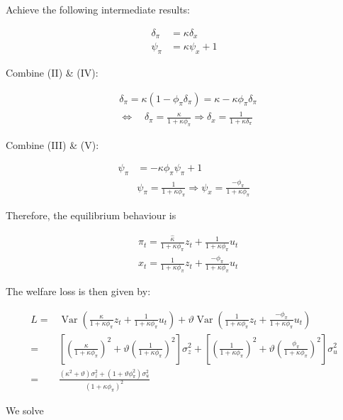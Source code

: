 {\begin{enumerate}[label=(\alph*)]
{Achieve the following intermediate results:

\begin{align*}
    \delta_{\pi} &= \kappa \delta_{x} \tag{IV}\\
    \psi_{\pi} &= \kappa \psi_{x}+1 \tag{V}
\end{align*}

Combine (II) \& (IV):

$$
\begin{aligned}
& \delta_{\pi}=\kappa\left(1-\phi_{\pi} \delta_{\pi}\right)=\kappa-\kappa \phi_{\pi} \delta_{\pi} \\
& \Leftrightarrow \quad \delta_{\pi}=\frac{\kappa}{1+\kappa \phi_{\pi}} \Rightarrow \delta_{x}=\frac{1}{1+\kappa \delta_{\pi}}
\end{aligned}
$$

Combine (III) \& (V):

$$
\begin{aligned}
\psi_{\pi} & =-\kappa \phi_{\pi} \psi_{\pi}+1 \\
& \psi_{\pi}=\frac{1}{1+\kappa \phi_{\pi}} \Rightarrow \psi_{x}=\frac{-\phi_{\pi}}{1+\kappa \phi_{\pi}}
\end{aligned}
$$

Therefore, the equilibrium behaviour is

$$
\begin{aligned}
& \pi_{t}=\frac{\hat{\kappa}}{1+\kappa \phi_\pi} z_{t}+\frac{1}{1+\kappa \phi_\pi} u_{t} \\
& x_{t}=\frac{1}{1+\kappa \phi_\pi} z_{t}+\frac{-\phi_{\pi}}{1+\kappa \phi_\pi} u_{t}
\end{aligned}
$$

The welfare loss is then given by:

$$
\begin{aligned}
L =& \operatorname{Var}\left(\frac{\kappa}{1+\kappa \phi_{\pi}} z_{t}+\frac{1}{1+\kappa \phi_{\pi}} u_{t}\right) + \vartheta \operatorname{Var}\left(\frac{1}{1+\kappa \phi_{\pi}} z_t +\frac{-\phi_{\pi}}{1+\kappa \phi_{\pi}} u_t \right) \\
=& \left[\left(\frac{\kappa}{1+\kappa \phi_{\pi}}\right)^{2}+\vartheta\left(\frac{1}{1+\kappa \phi_{\pi}}\right)^{2}\right] \sigma_{z}^{2} +\left[\left(\frac{1}{1+\kappa \phi_{\pi}}\right)^{2}+\vartheta\left(\frac{\phi_\pi}{1+\kappa \phi_{\pi}}\right)^{2}\right] \sigma_{u}^{2} \\
=& \frac{\left(\kappa^{2}+\vartheta\right) \sigma_{z}^{2}+\left(1+\vartheta \phi_{\pi}^{2}\right) \sigma_{u}^{2}}{\left(1+\kappa \phi_{\pi}\right)^{2}}
\end{aligned}
$$
}
{
\item 
We solve

}
\end{enumerate}}
